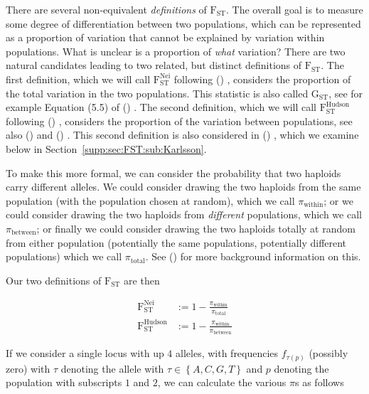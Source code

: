 \documentclass[a4paper,fontsize=9pt,DIV=14]{scrartcl}
\newcommand\secref[1]{Section~\ref{#1}}
\newcommand\citeay[1]{\citeauthor{#1} (\citeyear{#1}) \cite{#1}}
\begin{document}
There are several non-equivalent \emph{definitions} of $\text{F}_\text{ST}$.
The overall goal is to measure some degree of differentiation between two populations, which can be represented as a proportion of variation that cannot be explained by variation within populations.
What is unclear is a proportion of \emph{what} variation?
There are two natural candidates leading to two related, but distinct definitions of $\text{F}_\text{ST}$.
The first definition, which we will call $\text{F}_\text{ST}^\text{Nei}$ following \citeay{Nei1973}, considers the proportion of the total variation in the two populations.
This statistic is also called $\text{G}_\text{ST}$, see for example Equation (5.5) of \citeay{Hahn2018}.
The second definition, which we will call $\text{F}_\text{ST}^\text{Hudson}$ following \citeay{Hudson1992}, considers the proportion of the variation between populations, see also \citeay{Cockerham1969} and \citeay{Weir2002}.
This second definition is also considered in \citeay{Karlsson2007}, which we examine below in \secref{supp:sec:FST:sub:Karlsson}.

To make this more formal, we can consider the probability that two haploids carry different alleles.
We could consider drawing the two haploids from the same population (with the population chosen at random), which we call $\pi_\text{within}$; or we could consider drawing the two haploids from \emph{different} populations, which we call $\pi_\text{between}$; or finally we could consider drawing the two haploids totally at random from either population (potentially the same populations, potentially different populations) which we call $\pi_\text{total}$.
See \citeay{Bhatia2013} for more background information on this.

Our two definitions of $\text{F}_\text{ST}$ are then

\begin{align}
    \text{F}_\text{ST}^\text{Nei}    &:= 1 - \frac{\pi_\text{within}}{\pi_\text{total}} \label{eq:popnei}\\
    \text{F}_\text{ST}^\text{Hudson} &:= 1 - \frac{\pi_\text{within}}{\pi_\text{between}} \label{eq:pophudson}
\end{align}

If we consider a single locus with up $4$ alleles, with frequencies $f_{\tau(p)}$ (possibly zero) with  $\tau$ denoting the allele with $\tau \in \left\{A, C, G, T\right\}$ and $p$ denoting the population with subscripts $1$ and $2$, we can calculate the various $\pi$s as follows
\end{document}
